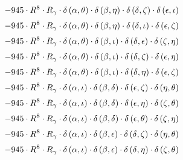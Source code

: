 \begin{subequations}
\begin{gather}
 \\[0.2em] \notag 		 - 945 \cdot R^{8} \cdot R_{\gamma{}} \cdot \delta{}\left(\alpha{}, \theta{}\right) \cdot \delta{}\left(\beta{}, \eta{}\right) \cdot \delta{}\left(\delta{}, \zeta{}\right) \cdot \delta{}\left(\epsilon{}, \iota{}\right) 
 \\[0.2em] \notag 		 - 945 \cdot R^{8} \cdot R_{\gamma{}} \cdot \delta{}\left(\alpha{}, \theta{}\right) \cdot \delta{}\left(\beta{}, \eta{}\right) \cdot \delta{}\left(\delta{}, \iota{}\right) \cdot \delta{}\left(\epsilon{}, \zeta{}\right) 
 \\[0.2em] \notag 		 - 945 \cdot R^{8} \cdot R_{\gamma{}} \cdot \delta{}\left(\alpha{}, \theta{}\right) \cdot \delta{}\left(\beta{}, \iota{}\right) \cdot \delta{}\left(\delta{}, \epsilon{}\right) \cdot \delta{}\left(\zeta{}, \eta{}\right) 
 \\[0.2em] \notag 		 - 945 \cdot R^{8} \cdot R_{\gamma{}} \cdot \delta{}\left(\alpha{}, \theta{}\right) \cdot \delta{}\left(\beta{}, \iota{}\right) \cdot \delta{}\left(\delta{}, \zeta{}\right) \cdot \delta{}\left(\epsilon{}, \eta{}\right) 
 \\[0.2em] \notag 		 - 945 \cdot R^{8} \cdot R_{\gamma{}} \cdot \delta{}\left(\alpha{}, \theta{}\right) \cdot \delta{}\left(\beta{}, \iota{}\right) \cdot \delta{}\left(\delta{}, \eta{}\right) \cdot \delta{}\left(\epsilon{}, \zeta{}\right) 
 \\[0.2em] \notag 		 - 945 \cdot R^{8} \cdot R_{\gamma{}} \cdot \delta{}\left(\alpha{}, \iota{}\right) \cdot \delta{}\left(\beta{}, \delta{}\right) \cdot \delta{}\left(\epsilon{}, \zeta{}\right) \cdot \delta{}\left(\eta{}, \theta{}\right) 
 \\[0.2em] \notag 		 - 945 \cdot R^{8} \cdot R_{\gamma{}} \cdot \delta{}\left(\alpha{}, \iota{}\right) \cdot \delta{}\left(\beta{}, \delta{}\right) \cdot \delta{}\left(\epsilon{}, \eta{}\right) \cdot \delta{}\left(\zeta{}, \theta{}\right) 
 \\[0.2em] \notag 		 - 945 \cdot R^{8} \cdot R_{\gamma{}} \cdot \delta{}\left(\alpha{}, \iota{}\right) \cdot \delta{}\left(\beta{}, \delta{}\right) \cdot \delta{}\left(\epsilon{}, \theta{}\right) \cdot \delta{}\left(\zeta{}, \eta{}\right) 
 \\[0.2em] \notag 		 - 945 \cdot R^{8} \cdot R_{\gamma{}} \cdot \delta{}\left(\alpha{}, \iota{}\right) \cdot \delta{}\left(\beta{}, \epsilon{}\right) \cdot \delta{}\left(\delta{}, \zeta{}\right) \cdot \delta{}\left(\eta{}, \theta{}\right) 
 \\[0.2em] \notag 		 - 945 \cdot R^{8} \cdot R_{\gamma{}} \cdot \delta{}\left(\alpha{}, \iota{}\right) \cdot \delta{}\left(\beta{}, \epsilon{}\right) \cdot \delta{}\left(\delta{}, \eta{}\right) \cdot \delta{}\left(\zeta{}, \theta{}\right) 

\end{gather}
\end{subequations}
